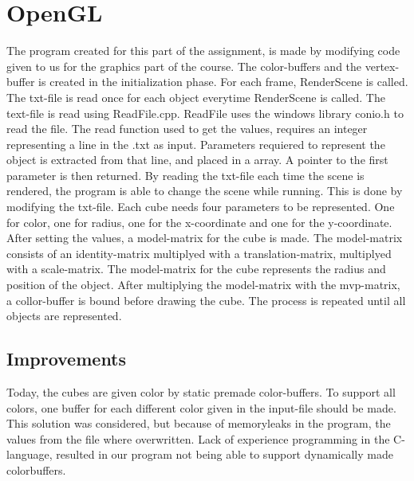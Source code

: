 \section{OpenGL}
The program created for this part of the assignment, 
is made by modifying code given to us for the graphics part of the course. 
The color-buffers and the vertex-buffer is created in the initialization phase. 
For each frame, RenderScene is called. 
The txt-file is read once for each object everytime RenderScene is called.
The text-file is read using ReadFile.cpp.
ReadFile uses the windows library conio.h to read the file. 
The read function used to get the values, requires an integer representing a line in the .txt as input.
Parameters requiered to represent the object is extracted from that line, and placed in a array.
A pointer to the first parameter is then returned.
By reading the txt-file each time the scene is rendered, the program is able to change the scene while running.
This is done by modifying the txt-file. 
Each cube needs four parameters to be represented.
One for color, one for radius, one for the x-coordinate and one for the y-coordinate. 
After setting the values, a model-matrix for the cube is made. 
The model-matrix consists of an identity-matrix multiplyed with a translation-matrix, multiplyed with a scale-matrix. 
The model-matrix for the cube represents the radius and position of the object. 
After multiplying the model-matrix with the mvp-matrix, a collor-buffer is bound before drawing the cube. 
The process is repeated until all objects are represented. 


\subsection{Improvements}
Today, the cubes are given color by static premade color-buffers. 
To support all colors, one buffer for each different color given in the input-file should be made. 
This solution was considered, but because of memoryleaks in the program, the values from the file where overwritten. 
Lack of experience programming in the C-language, resulted in our program not being able to support dynamically made colorbuffers.


